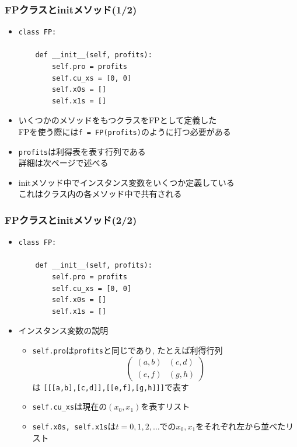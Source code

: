 \documentclass[dvipdfmx,fleqn,handout]{beamer}
\begin{document}
\begin{frame}[fragile]%
\frametitle{FPクラスとinitメソッド(1/2)}
\begin{itemize}\setlength{\parskip}{0.5em}
\item

\footnotesize
\begin{verbatim}
class FP:

    def __init__(self, profits):
        self.pro = profits
        self.cu_xs = [0, 0]
        self.x0s = []
        self.x1s = []
 \end{verbatim}\pause
\normalsize

\item
いくつかのメソッドをもつクラスをFPとして定義した\pause\\
FPを使う際には\verb|f = FP(profits)|のように打つ必要がある\pause
\item
\verb|profits|は利得表を表す行列である\\
詳細は次ページで述べる\pause
\item
initメソッド中でインスタンス変数をいくつか定義している\pause\\
これはクラス内の各メソッド中で共有される



\end{itemize}
\end{frame}


\begin{frame}[fragile]%
\frametitle{FPクラスとinitメソッド(2/2)}
\begin{itemize}\setlength{\parskip}{0.5em}
\item

\footnotesize
\begin{verbatim}
class FP:

    def __init__(self, profits):
        self.pro = profits
        self.cu_xs = [0, 0]
        self.x0s = []
        self.x1s = []
 \end{verbatim}\pause
\normalsize
\item
インスタンス変数の説明\pause
\begin{itemize}\setlength{\parskip}{0.5em}

\item
\verb|self.pro|は\verb|profits|と同じであり, たとえば利得行列
\footnotesize
\begin{equation*}
\begin{pmatrix}
(a,b) & (c,d)\\
(e,f) & (g,h)
\end{pmatrix}
\end{equation*}
\normalsize
は
\verb|[[[a,b],[c,d]],[[e,f],[g,h]]]|で表す
\pause
\item
\verb|self.cu_xs|は現在の$(x_0,x_1)$を表すリスト\pause
\item
\verb|self.x0s, self.x1s|は$t=0,1,2,\dots$での$x_0,x_1$をそれぞれ左から並べたリスト

\end{itemize}

\end{itemize}
\end{frame}
\end{document}
